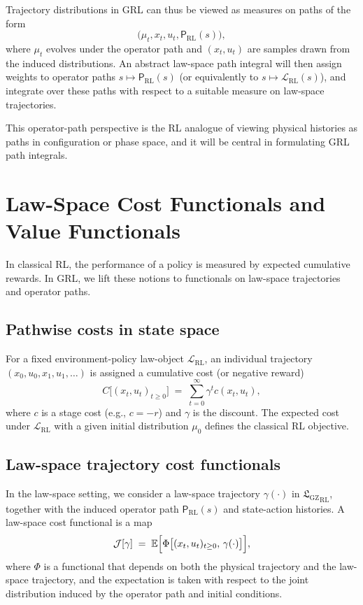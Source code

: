 \documentclass[11pt]{book}
\newcommand{\GZLS}{\ensuremath{\mathfrak{L}_{\mathrm{GZ}}}}
\theoremstyle{plain}
\theoremstyle{definition}
\theoremstyle{remark}
\begin{document}
Trajectory distributions in GRL can thus be viewed as measures on
paths of the form
\[
   \bigl(\mu_t, x_t, u_t, \mathsf{P}_{\mathrm{RL}}(s)\bigr),
\]
where $\mu_t$ evolves under the operator path and $(x_t,u_t)$ are
samples drawn from the induced distributions. An abstract law-space
path integral will then assign weights to operator paths
$s\mapsto\mathsf{P}_{\mathrm{RL}}(s)$ (or equivalently to
$s\mapsto\mathcal{L}_{\mathrm{RL}}(s)$), and integrate over these
paths with respect to a suitable measure on law-space trajectories.

This operator-path perspective is the RL analogue of viewing
physical histories as paths in configuration or phase space, and it
will be central in formulating GRL path integrals.

\section{Law-Space Cost Functionals and Value Functionals}
\label{sec:lawspace-cost-value}


In classical RL, the performance of a policy is measured by expected
cumulative rewards. In GRL, we lift these notions to functionals on
law-space trajectories and operator paths.

\subsection*{Pathwise costs in state space}

For a fixed environment-policy law-object
$\mathcal{L}_{\mathrm{RL}}$, an individual trajectory
$(x_0,u_0,x_1,u_1,\dots)$ is assigned a cumulative cost (or negative
reward)
\[
   C\bigl[(x_t,u_t)_{t\ge0}\bigr]
   \;=\;
   \sum_{t=0}^\infty \gamma^t c(x_t,u_t),
\]
where $c$ is a stage cost (e.g., $c=-r$) and $\gamma$ is the
discount. The expected cost under $\mathcal{L}_{\mathrm{RL}}$ with
a given initial distribution $\mu_0$ defines the classical RL
objective.

\subsection*{Law-space trajectory cost functionals}

In the law-space setting, we consider a law-space trajectory
$\gamma(\cdot)$ in ${\GZLS}_{\mathrm{RL}}$, together with the induced
operator path $\mathsf{P}_{\mathrm{RL}}(s)$ and state-action
histories. A law-space cost functional is a map
\[
   \mathcal{J}[\gamma]
   \;=\;
   \mathbb{E}\Bigl[
     \Phi\bigl[(x_t,u_t)_{t\ge0},\, \gamma(\cdot)\bigr]
   \Bigr],
\]
where $\Phi$ is a functional that depends on both the physical
trajectory and the law-space trajectory, and the expectation is
taken with respect to the joint distribution induced by the
operator path and initial conditions.
\end{document}
